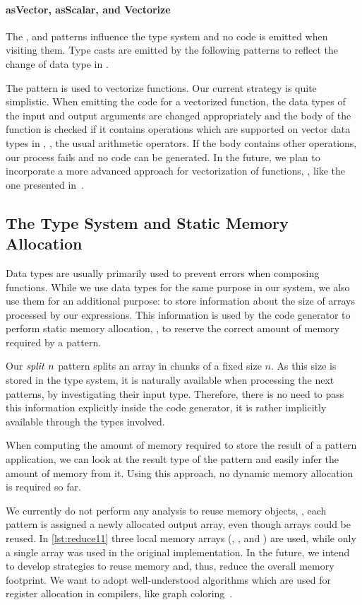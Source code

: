 \paragraph{{\footnotesize as}Vector, {\footnotesize as}Scalar, and Vectorize}
The \asVector, and \asScalar patterns influence the type system and no \OpenCL code is emitted when visiting them.
Type casts are emitted by the following patterns to reflect the change of data type in \OpenCL.

The \vect pattern is used to vectorize functions.
Our current strategy is quite simplistic.
When emitting the \OpenCL code for a vectorized function, the data types of the input and output arguments are changed appropriately and the body of the function is checked if it contains operations which are supported on vector data types in \OpenCL, \eg, the usual arithmetic operators.
If the body contains other operations, our process fails and no \OpenCL code can be generated.
In the future, we plan to incorporate a more advanced approach for vectorization of functions, \eg, like the one presented in~\cite{KarrenbergHa2011}.


\subsection{The Type System and Static Memory Allocation}
\label{section:typeSystem}
Data types are usually primarily used to prevent errors when composing functions.
While we use data types for the same purpose in our system, we also use them for an additional purpose: to store information about the size of arrays processed by our expressions.
This information is used by the code generator to perform static memory allocation, \ie, to reserve the correct amount of memory required by a pattern.

Our $\text{\textit{split}}\ n$ pattern splits an array in chunks of a fixed size $n$.
As this size is stored in the type system, it is naturally available when processing the next patterns, by investigating their input type.
Therefore, there is no need to pass this information explicitly inside the code generator, it is rather implicitly available through the types involved.

When computing the amount of memory required to store the result of a pattern application, we can look at the result type of the pattern and easily infer the amount of memory from it.
Using this approach, no dynamic memory allocation is required so far.

We currently do not perform any analysis to reuse memory objects, \ie, each pattern is assigned a newly allocated output array, even though arrays could be reused.
In \autoref{lst:reduce11} three local memory arrays (, , and ) are used, while only a single array was used in the original \OpenCL implementation.
In the future, we intend to develop strategies to reuse memory and, thus, reduce the overall memory footprint.
We want to adopt well-understood algorithms which are used for register allocation in compilers, like graph coloring~\cite{CooperTo2004}.


